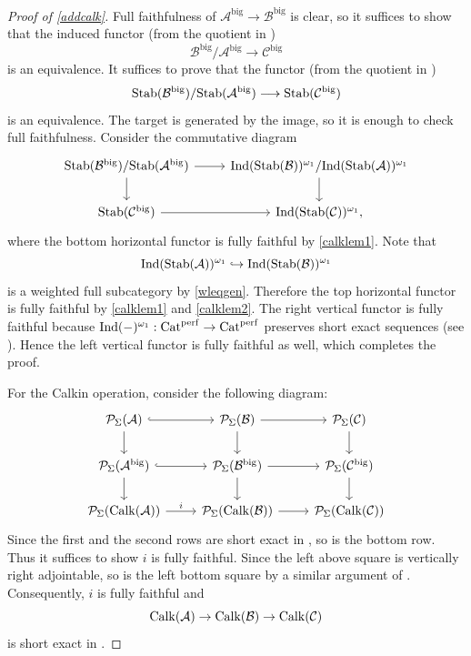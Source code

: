 \documentclass[a4paper,10pt, oneside]{amsart}
\begin{document}
\begin{proof}[Proof of \cref{addcalk}]
	Full faithfulness of \(\mathcal{A}^{\mathrm{big}}\to \mathcal{B}^{\mathrm{big}}\) is clear, so it suffices to show that the induced functor (from the quotient in \catadidem)
	\[
	\mathcal{B}^{\mathrm{big}}/\mathcal{A}^{\mathrm{big}} \longrightarrow \mathcal{C}^{\mathrm{big}}
	\]
	is an equivalence.
 It suffices to prove that the functor  (from the quotient in \catper)
\[
\mathrm{Stab}(\mathcal{B}^{\mathrm{big}})/\mathrm{Stab}(\mathcal{A}^{\mathrm{big}})\longrightarrow \mathrm{Stab}(\mathcal{C}^{\mathrm{big}})
\]
is an equivalence. The target is generated by the image, so it is enough to check full faithfulness. Consider the commutative diagram
\[
\begin{tikzcd}
	\stab(\mathcal{B}^{\mathrm{big}})/\stab(\mathcal{A}^{\mathrm{big}}) \ar[r] \ar[d] &
	\ind(\stab(\mathcal{B}))^{\omega_1}/\ind(\stab(\mathcal{A}))^{\omega_1} \ar[d] \\
	\stab(\mathcal{C}^{\mathrm{big}}) \ar[r] & \ind(\stab(\mathcal{C}))^{\omega_1},
\end{tikzcd}
\]
where the bottom horizontal functor is fully faithful by  \cref{calklem1}. Note that $$\mathrm{Ind}(\mathrm{Stab}(\mathcal{A}))^{\omega_1}\hookrightarrow\mathrm{Ind}(\mathrm{Stab}(\mathcal{B}))^{\omega_1}$$ is a weighted full subcategory by \cref{wleqgen}. Therefore the top horizontal functor is fully faithful by \cref{calklem1} and \cref{calklem2}.  The right vertical functor is fully faithful because \(\mathrm{Ind}(-)^{\omega_1}:\mathrm{Cat}^{\mathrm{perf}}\to \mathrm{Cat}^{\mathrm{perf}}\) preserves short exact sequences (see \cite[Proposition A.26]{ramzi2024dualizable}). Hence the left vertical functor is fully faithful as well, which completes the proof.

For the Calkin operation, consider the following diagram:
$$\begin{tikzcd}
	\mcp_\Sigma(\mca) \arrow[d] \arrow[r, hook]            & \mcp_\Sigma(\mcb) \arrow[d] \arrow[r]            & \mcp_\Sigma(\mcc) \arrow[d]            \\
	\mcp_\Sigma(\mca^{\op{big}}) \arrow[r, hook] \arrow[d] & \mcp_\Sigma(\mcb^{\op{big}}) \arrow[r] \arrow[d] & \mcp_\Sigma(\mcc^{\op{big}}) \arrow[d] \\
	\mcp_\Sigma(\calk(\mca)) \arrow[r, "i"]                & \mcp_\Sigma(\calk(\mcb)) \arrow[r]               & \mcp_\Sigma(\calk(\mcc))              
\end{tikzcd}$$
Since the first and the second rows are short exact in \praddbl, so is the bottom row. Thus it suffices to show $i$ is fully faithful. Since the left above square is vertically right adjointable, so is the left bottom square by a similar argument of \cite[Proposition A.16]{ramzi2024dualizable}. Consequently, $i$ is fully faithful and $$\mathrm{Calk}(\mathcal{A})\to\mathrm{Calk}(\mathcal{B})\to\mathrm{Calk}(\mathcal{C})$$ is short exact in \catadidem.
\end{proof}
\end{document}
